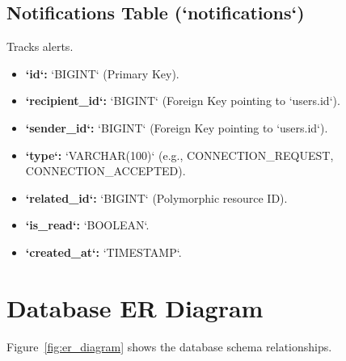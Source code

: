 \subsection{Notifications Table (`notifications`)}
Tracks alerts.
\begin{itemize}
    \item \textbf{`id`:} `BIGINT` (Primary Key).
    \item \textbf{`recipient\_id`:} `BIGINT` (Foreign Key pointing to `users.id`).
    \item \textbf{`sender\_id`:} `BIGINT` (Foreign Key pointing to `users.id`).
    \item \textbf{`type`:} `VARCHAR(100)` (e.g., CONNECTION\_REQUEST, CONNECTION\_ACCEPTED).
    \item \textbf{`related\_id`:} `BIGINT` (Polymorphic resource ID).
    \item \textbf{`is\_read`:} `BOOLEAN`.
    \item \textbf{`created\_at`:} `TIMESTAMP`.
\end{itemize}

\section{Database ER Diagram}
Figure~\ref{fig:er_diagram} shows the database schema relationships.

